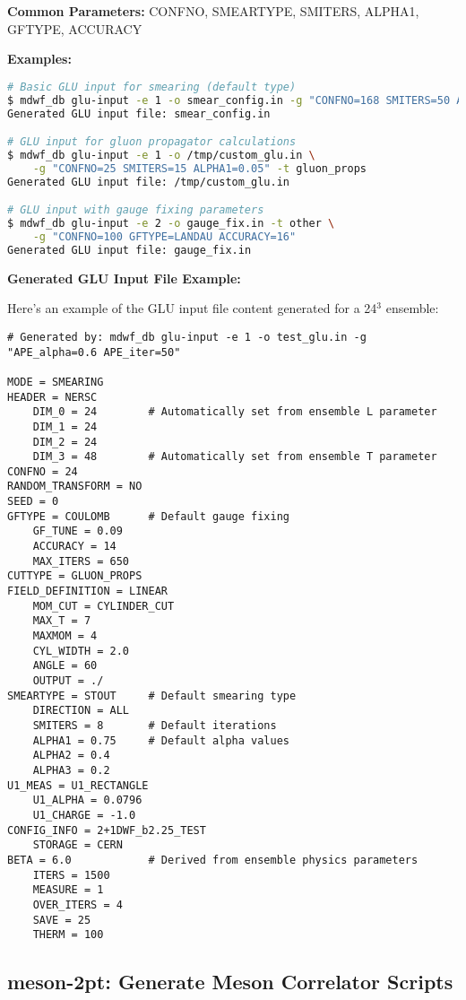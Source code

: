 \documentclass{article}
\begin{document}
\textbf{Common Parameters:}
CONFNO, SMEARTYPE, SMITERS, ALPHA1, GFTYPE, ACCURACY

\textbf{Examples:}
\begin{lstlisting}[language=bash]
# Basic GLU input for smearing (default type)
$ mdwf_db glu-input -e 1 -o smear_config.in -g "CONFNO=168 SMITERS=50 ALPHA1=0.1"
Generated GLU input file: smear_config.in

# GLU input for gluon propagator calculations
$ mdwf_db glu-input -e 1 -o /tmp/custom_glu.in \
    -g "CONFNO=25 SMITERS=15 ALPHA1=0.05" -t gluon_props
Generated GLU input file: /tmp/custom_glu.in

# GLU input with gauge fixing parameters
$ mdwf_db glu-input -e 2 -o gauge_fix.in -t other \
    -g "CONFNO=100 GFTYPE=LANDAU ACCURACY=16"
Generated GLU input file: gauge_fix.in
\end{lstlisting}

\textbf{Generated GLU Input File Example:}

Here's an example of the GLU input file content generated for a 24$^3$ ensemble:

\begin{lstlisting}
# Generated by: mdwf_db glu-input -e 1 -o test_glu.in -g "APE_alpha=0.6 APE_iter=50"

MODE = SMEARING    
HEADER = NERSC
    DIM_0 = 24        # Automatically set from ensemble L parameter
    DIM_1 = 24
    DIM_2 = 24
    DIM_3 = 48        # Automatically set from ensemble T parameter
CONFNO = 24
RANDOM_TRANSFORM = NO
SEED = 0
GFTYPE = COULOMB      # Default gauge fixing
    GF_TUNE = 0.09
    ACCURACY = 14
    MAX_ITERS = 650
CUTTYPE = GLUON_PROPS
FIELD_DEFINITION = LINEAR
    MOM_CUT = CYLINDER_CUT
    MAX_T = 7
    MAXMOM = 4
    CYL_WIDTH = 2.0
    ANGLE = 60
    OUTPUT = ./
SMEARTYPE = STOUT     # Default smearing type
    DIRECTION = ALL
    SMITERS = 8       # Default iterations
    ALPHA1 = 0.75     # Default alpha values
    ALPHA2 = 0.4
    ALPHA3 = 0.2
U1_MEAS = U1_RECTANGLE
    U1_ALPHA = 0.0796
    U1_CHARGE = -1.0
CONFIG_INFO = 2+1DWF_b2.25_TEST
    STORAGE = CERN
BETA = 6.0            # Derived from ensemble physics parameters
    ITERS = 1500
    MEASURE = 1
    OVER_ITERS = 4
    SAVE = 25
    THERM = 100
\end{lstlisting}

\subsection{meson-2pt: Generate Meson Correlator Scripts}
\end{document}

